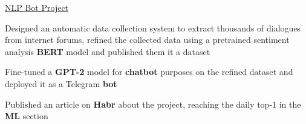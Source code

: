 \begin{cventries}
  \cventry
    {} %
    {\faGithub\acvHeaderIconSep\href{https://github.com/BlackSamorez/ebanko}{NLP Bot Project}} %
    {} %
    {} %
    {
      \begin{cvitems} %
        \item {Designed an automatic data collection system to extract thousands of dialogues from internet forums, refined the collected data using a pretrained sentiment analysis \textbf{BERT} model and published them it a dataset}
        \item {Fine-tuned a \textbf{GPT-2} model for \textbf{chatbot} purposes on the refined dataset and deployed it as a Telegram \textbf{bot}}
        \item {Published an article on \textbf{Habr} about the project, reaching the daily top-1 in the \textbf{ML} section}
      \end{cvitems}
    }
    

\end{cventries}